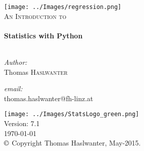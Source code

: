 \begin{titlepage}

\begin{center}


\texttt{[image: ../Images/regression.png]}\\[2cm]


\textsc{\Large An Introduction to}\\[0.5cm]


\HRule \\[0.4cm]
{ \huge \bfseries Statistics with Python}\\[0.4cm]

\HRule \\[1.5cm]

\begin{minipage}{0.4\textwidth}
\begin{flushleft} \large
\emph{Author:}\\
Thomas \textsc{Haslwanter}
\end{flushleft}
\end{minipage}
\begin{minipage}{0.4\textwidth}
\begin{flushright} \large
\emph{email:} \\
{\small thomas.haslwanter@fh-linz.at}
\end{flushright}
\end{minipage}

\vfill

\texttt{[image: ../Images/StatsLogo\_green.png]}\\
Version: 7.1 \\
{\large \today} \\[1cm]
\footnotesize{$\copyright$ Copyright Thomas Haslwanter, May-2015.}


\end{center}

\end{titlepage}
